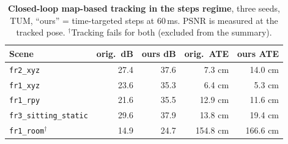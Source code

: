 \begin{table}[t]
\centering
\footnotesize\setlength{\tabcolsep}{3pt}
\begin{tabular}{lrrrr}
\toprule
\textbf{Scene} & orig.\ dB & ours dB & orig.\ ATE & ours ATE \\
\midrule
\texttt{fr2\_xyz} & 27.4 & 37.6 & 7.3 cm & 14.0 cm \\
\texttt{fr1\_xyz} & 23.6 & 35.3 & 6.4 cm & 5.3 cm \\
\texttt{fr1\_rpy} & 21.6 & 35.5 & 12.9 cm & 11.6 cm \\
\texttt{fr3\_sitting\_static} & 29.6 & 37.9 & 13.8 cm & 19.4 cm \\
\texttt{fr1\_room}$^\dagger$ & 14.9 & 24.7 & 154.8 cm & 166.6 cm \\
\bottomrule
\end{tabular}
\caption{\textbf{Closed-loop map-based tracking in the steps regime}, three seeds, TUM, ``ours'' = time-targeted steps at 60\,ms. PSNR is measured at the tracked pose. $^\dagger$Tracking fails for both (excluded from the summary).}
\label{tab:engineclosed}
\end{table}
